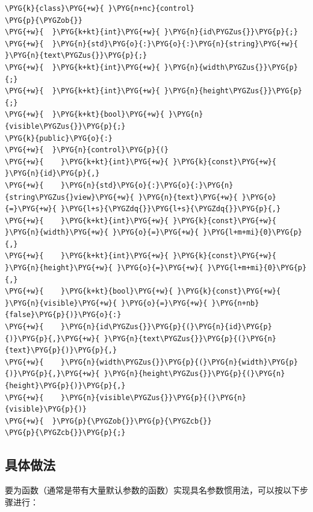 
\begin{codeblockbg}
\begin{Verbatim}[commandchars=\\\{\},breaklines=true,breakanywhere=true,fontsize=\codefont,xleftmargin=17bp]
\PYG{k}{class}\PYG{+w}{ }\PYG{n+nc}{control}
\PYG{p}{\PYGZob{}}
\PYG{+w}{  }\PYG{k+kt}{int}\PYG{+w}{ }\PYG{n}{id\PYGZus{}}\PYG{p}{;}
\PYG{+w}{  }\PYG{n}{std}\PYG{o}{:}\PYG{o}{:}\PYG{n}{string}\PYG{+w}{ }\PYG{n}{text\PYGZus{}}\PYG{p}{;}
\PYG{+w}{  }\PYG{k+kt}{int}\PYG{+w}{ }\PYG{n}{width\PYGZus{}}\PYG{p}{;}
\PYG{+w}{  }\PYG{k+kt}{int}\PYG{+w}{ }\PYG{n}{height\PYGZus{}}\PYG{p}{;}
\PYG{+w}{  }\PYG{k+kt}{bool}\PYG{+w}{ }\PYG{n}{visible\PYGZus{}}\PYG{p}{;}
\PYG{k}{public}\PYG{o}{:}
\PYG{+w}{  }\PYG{n}{control}\PYG{p}{(}
\PYG{+w}{    }\PYG{k+kt}{int}\PYG{+w}{ }\PYG{k}{const}\PYG{+w}{ }\PYG{n}{id}\PYG{p}{,}
\PYG{+w}{    }\PYG{n}{std}\PYG{o}{:}\PYG{o}{:}\PYG{n}{string\PYGZus{}view}\PYG{+w}{ }\PYG{n}{text}\PYG{+w}{ }\PYG{o}{=}\PYG{+w}{ }\PYG{l+s}{\PYGZdq{}}\PYG{l+s}{\PYGZdq{}}\PYG{p}{,}
\PYG{+w}{    }\PYG{k+kt}{int}\PYG{+w}{ }\PYG{k}{const}\PYG{+w}{ }\PYG{n}{width}\PYG{+w}{ }\PYG{o}{=}\PYG{+w}{ }\PYG{l+m+mi}{0}\PYG{p}{,}
\PYG{+w}{    }\PYG{k+kt}{int}\PYG{+w}{ }\PYG{k}{const}\PYG{+w}{ }\PYG{n}{height}\PYG{+w}{ }\PYG{o}{=}\PYG{+w}{ }\PYG{l+m+mi}{0}\PYG{p}{,}
\PYG{+w}{    }\PYG{k+kt}{bool}\PYG{+w}{ }\PYG{k}{const}\PYG{+w}{ }\PYG{n}{visible}\PYG{+w}{ }\PYG{o}{=}\PYG{+w}{ }\PYG{n+nb}{false}\PYG{p}{)}\PYG{o}{:}
\PYG{+w}{    }\PYG{n}{id\PYGZus{}}\PYG{p}{(}\PYG{n}{id}\PYG{p}{)}\PYG{p}{,}\PYG{+w}{ }\PYG{n}{text\PYGZus{}}\PYG{p}{(}\PYG{n}{text}\PYG{p}{)}\PYG{p}{,}
\PYG{+w}{    }\PYG{n}{width\PYGZus{}}\PYG{p}{(}\PYG{n}{width}\PYG{p}{)}\PYG{p}{,}\PYG{+w}{ }\PYG{n}{height\PYGZus{}}\PYG{p}{(}\PYG{n}{height}\PYG{p}{)}\PYG{p}{,}
\PYG{+w}{    }\PYG{n}{visible\PYGZus{}}\PYG{p}{(}\PYG{n}{visible}\PYG{p}{)}
\PYG{+w}{  }\PYG{p}{\PYGZob{}}\PYG{p}{\PYGZcb{}}
\PYG{p}{\PYGZcb{}}\PYG{p}{;}
\end{Verbatim}
\end{codeblockbg}



\subsection{具体做法}



要为函数（通常是带有大量默认参数的函数）实现具名参数惯用法，可以按以下步骤进行：



